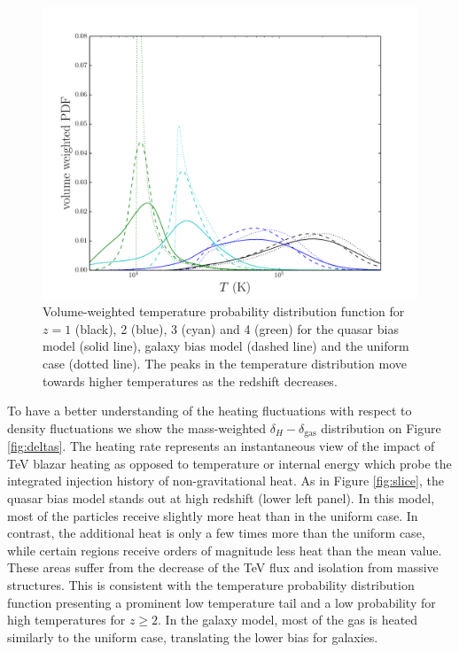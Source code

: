 \documentclass[numberedappendix]{emulateapj}
\begin{document}
\begin{figure}[h]
\centering
\includegraphics[width = .45\textwidth ]{full_PDF_512_gal_qso.pdf}
\caption{Volume-weighted temperature probability distribution function for $z=1$ (black), 2 (blue), 3 (cyan) and 4 (green) for the quasar bias model (solid line), galaxy bias model (dashed line) and the uniform case (dotted line). The peaks in the temperature distribution move towards higher temperatures as the redshift decreases.}
\label{fig:PDF}
\end{figure}
To have a better understanding of the heating fluctuations with respect to density fluctuations we show the mass-weighted $\delta_H-\delta_{\mathrm{gas}}$ distribution on Figure \ref{fig:deltas}. The heating rate represents an instantaneous view of the impact of TeV blazar heating as opposed to temperature or internal energy which probe the integrated injection history of non-gravitational heat. As in Figure \ref{fig:slice}, the quasar bias model stands out at high redshift (lower left panel).  In this model, most of the particles receive slightly more heat than in the uniform case. In contrast, the additional heat is only a few times more than the uniform case, while certain regions receive orders of magnitude less heat than the mean value. These areas suffer from the decrease of the TeV flux and isolation from massive structures. This is consistent with the temperature probability distribution function presenting a prominent low temperature tail and a low probability for high temperatures for $z\geqslant 2$. In the galaxy model, most of the gas is heated similarly to the uniform case, translating the lower bias for galaxies.
\end{document}
